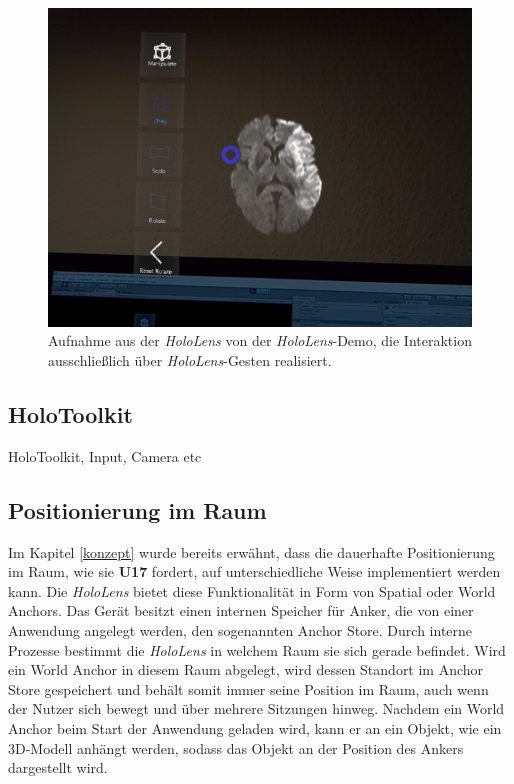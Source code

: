 \begin{figure}[!htb]
	\centering
	\includegraphics[width=0.7\linewidth]{images/hololens_prototyp.jpg}
	\caption{Aufnahme aus der \textit{HoloLens} von der \textit{HoloLens}-Demo, die Interaktion ausschließlich über \textit{HoloLens}-Gesten realisiert.}
	\label{img:prototyp}
\end{figure}
\FloatBarrier

\subsection{HoloToolkit}

HoloToolkit, Input, Camera etc

\subsection{Positionierung im Raum}
\label{anchor}

Im Kapitel \ref{konzept} wurde bereits erwähnt, dass die dauerhafte Positionierung im Raum, wie sie \textbf{U17} fordert, auf unterschiedliche Weise implementiert werden kann. 
Die \textit{HoloLens} bietet diese Funktionalität in Form von Spatial oder World Anchors. Das Gerät besitzt einen internen Speicher für Anker, die von einer Anwendung angelegt werden, den sogenannten Anchor Store. Durch interne Prozesse bestimmt die \textit{HoloLens} in welchem Raum sie sich gerade befindet. Wird ein World Anchor in diesem Raum abgelegt, wird dessen Standort im Anchor Store gespeichert und behält somit immer seine Position im Raum, auch wenn der Nutzer sich bewegt und über mehrere Sitzungen hinweg. Nachdem ein World Anchor beim Start der Anwendung geladen wird, kann er an ein Objekt, wie ein 3D-Modell anhängt werden, sodass das Objekt an der Position des Ankers dargestellt wird. 

